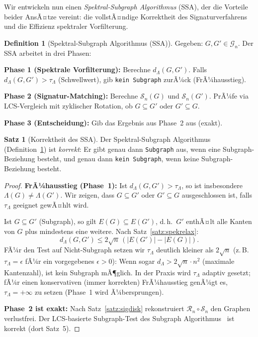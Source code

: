 ﻿\documentclass[a4paper,12pt]{article}
\theoremstyle{definition}
\newtheorem{definition}{Definition}
\newtheorem{satz}{Satz}
\begin{document}
Wir entwickeln nun einen \emph{Spektral-Subgraph Algorithmus} (SSA), der die Vorteile beider
AnsÃ¤tze vereint: die vollstÃ¤ndige Korrektheit des Signaturverfahrens und die Effizienz
spektraler Vorfilterung.

\begin{definition}[Spektral-Subgraph Algorithmus (SSA)]
\label{def:ssa}
    Gegeben: $G, G' \in \mathcal{G}_n$. Der SSA arbeitet in drei Phasen:

    \textbf{Phase 1 (Spektrale Vorfilterung):}
    Berechne $d_\Lambda(G, G')$. Falls $d_\Lambda(G, G') > \tau_\Lambda$
    (Schwellwert), gib \texttt{kein Subgraph} zurÃ¼ck (FrÃ¼hausstieg).

    \textbf{Phase 2 (Signatur-Matching):}
    Berechne $\mathcal{S}_n(G)$ und $\mathcal{S}_n(G')$. PrÃ¼fe via LCS-Vergleich
    mit zyklischer Rotation, ob $G \subseteq G'$ oder $G' \subseteq G$.

    \textbf{Phase 3 (Entscheidung):}
    Gib das Ergebnis aus Phase~2 aus (exakt).
\end{definition}

\begin{satz}[Korrektheit des SSA]
\label{satz:ssa_korrekt}
    Der Spektral-Subgraph Algorithmus (Definition~\ref{def:ssa}) ist \emph{korrekt}:
    Er gibt genau dann \texttt{Subgraph} aus, wenn eine Subgraph-Beziehung besteht,
    und genau dann \texttt{kein Subgraph}, wenn keine Subgraph-Beziehung besteht.
\end{satz}

\begin{proof}
    \textbf{FrÃ¼hausstieg (Phase~1):}
    Ist $d_\Lambda(G, G') > \tau_\Lambda$, so ist insbesondere $\Lambda(G) \neq \Lambda(G')$.
    Wir zeigen, dass $G \subseteq G'$ oder $G' \subseteq G$ ausgeschlossen ist, falls
    $\tau_\Lambda$ geeignet gewÃ¤hlt wird.

    Ist $G \subseteq G'$ (Subgraph), so gilt $E(G) \subseteq E(G')$, d.\,h.\ $G'$
    enthÃ¤lt alle Kanten von $G$ plus mindestens eine weitere. Nach Satz~\ref{satz:spekrelax}:
    \[
    d_\Lambda(G, G') \leq 2\sqrt{n}\,(|E(G')| - |E(G)|).
    \]
    FÃ¼r den Test auf Nicht-Subgraph setzen wir $\tau_\Lambda$ deutlich kleiner als $2\sqrt{n}$
    (z.\,B.\ $\tau_\Lambda = \epsilon$ fÃ¼r ein vorgegebenes $\epsilon > 0$): Wenn sogar
    $d_\Lambda > 2\sqrt{n} \cdot n^2$ (maximale Kantenzahl), ist kein Subgraph mÃ¶glich.
    In der Praxis wird $\tau_\Lambda$ adaptiv gesetzt; fÃ¼r einen konservativen (immer korrekten)
    FrÃ¼hausstieg genÃ¼gt es, $\tau_\Lambda = +\infty$ zu setzen (Phase~1 wird Ã¼bersprungen).

    \textbf{Phase~2 ist exakt:}
    Nach Satz~\ref{satz:sigdisk} rekonstruiert $\mathcal{R}_n \circ \mathcal{S}_n$ den Graphen
    verlustfrei. Der LCS-basierte Subgraph-Test des Subgraph Algorithmus~\cite{epp2026subgraph}
    ist korrekt (dort Satz~5). \qedhere
\end{proof}
\end{document}
